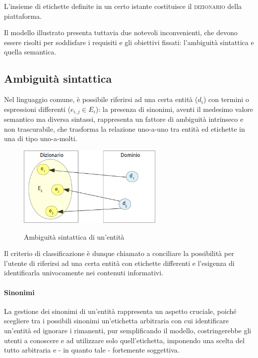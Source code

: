 L'insieme di etichette definite in un certo istante costituisce il \textsc{dizionario} della piattaforma.

Il modello illustrato presenta tuttavia due notevoli inconvenienti, che devono essere risolti per soddisfare i requisiti e gli obiettivi fissati: l'ambiguità sintattica e quella semantica.

\subsection{Ambiguità sintattica}
\label{sec:tesi:stage:criterio-classificazione_ambiguità-sintattica}
Nel linguaggio comune, è possibile riferirsi ad una certa entità ($d_i$) con termini o espressioni differenti ($e_{i,j} \in E_i$): la presenza di sinonimi, aventi il medesimo valore semantico ma diversa sintassi, rappresenta un fattore di ambiguità intrinseco e non trascurabile, che trasforma la relazione uno-a-uno tra entità ed etichette in una di tipo uno-a-molti.

\begin{figure}[ht]
	\begin{center}
		\includegraphics[width=7cm]{img/ambiguita-sintattica.png}
		\label{fig:tesi:stage:fase-uno:ambiguita-sintattica}
		\caption{Ambiguità sintattica di un'entità}
	\end{center}
\end{figure}

Il criterio di classificazione è dunque chiamato a conciliare la possibilità per l'utente di riferirsi ad una certa entità con etichette differenti e l'esigenza di identificarla univocamente nei contenuti informativi.

\paragraph{Sinonimi}
La gestione dei sinonimi di un'entità rappresenta un aspetto cruciale, poiché scegliere tra i possibili sinonimi un'etichetta arbitraria con cui identificare un'entità ed ignorare i rimanenti, pur semplificando il modello, costringerebbe gli utenti a conoscere e ad utilizzare solo quell'etichetta, imponendo una scelta del tutto arbitraria e - in quanto tale - fortemente soggettiva.

